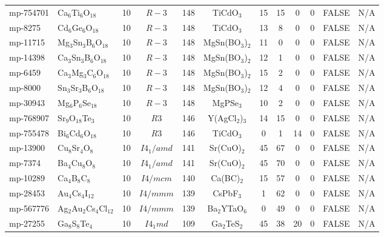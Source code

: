 {\begin{longtable}{llcccccccccc}
    mp-754701 & Ca$_{6}$Ti$_{6}$O$_{18}$ & 10    & $R-3$ & 148   & TiCdO$_{3}$ & 15    & 15    & 0     & 0     & FALSE & N/A \\
    mp-8275 & Cd$_{6}$Ge$_{6}$O$_{18}$ & 10    & $R-3$ & 148   & TiCdO$_{3}$ & 13    & 8     & 0     & 0     & FALSE & N/A \\
    mp-11715 & Mg$_{3}$Sn$_{3}$B$_{6}$O$_{18}$ & 10    & $R-3$ & 148   & MgSn(BO$_{3}$)$_{2}$ & 11    & 0     & 0     & 0     & FALSE & N/A \\
    mp-14398 & Ca$_{3}$Sn$_{3}$B$_{6}$O$_{18}$ & 10    & $R-3$ & 148   & MgSn(BO$_{3}$)$_{2}$ & 12    & 1     & 0     & 0     & FALSE & N/A \\
    mp-6459 & Ca$_{3}$Mg$_{3}$C$_{6}$O$_{18}$ & 10    & $R-3$ & 148   & MgSn(BO$_{3}$)$_{2}$ & 15    & 2     & 0     & 0     & FALSE & N/A \\
    mp-8000 & Sn$_{3}$Sr$_{3}$B$_{6}$O$_{18}$ & 10    & $R-3$ & 148   & MgSn(BO$_{3}$)$_{2}$ & 12    & 4     & 0     & 0     & FALSE & N/A \\
    mp-30943 & Mg$_{6}$P$_{6}$Se$_{18}$ & 10    & $R-3$ & 148   & MgPSe$_{3}$ & 10    & 2     & 0     & 0     & FALSE & N/A \\
    mp-768907 & Sr$_{9}$O$_{18}$Te$_{3}$ & 10    & $R3$  & 146   & Y(AgCl$_{2}$)$_{3}$ & 14    & 15    & 0     & 0     & FALSE & N/A \\
    mp-755478 & Bi$_{6}$Cd$_{6}$O$_{18}$ & 10    & $R3$  & 146   & TiCdO$_{3}$ & 0     & 1     & 14    & 0     & FALSE & N/A \\
    mp-13900 & Cu$_{8}$Sr$_{4}$O$_{8}$ & 10    & $I4_1/amd$ & 141   & Sr(CuO)$_{2}$ & 45    & 67    & 0     & 0     & FALSE & N/A \\
    mp-7374 & Ba$_{4}$Cu$_{8}$O$_{8}$ & 10    & $I4_1/amd$ & 141   & Sr(CuO)$_{2}$ & 45    & 70    & 0     & 0     & FALSE & N/A \\
    mp-10289 & Ca$_{4}$B$_{8}$C$_{8}$ & 10    & $I4/mcm$ & 140   & Ca(BC)$_{2}$ & 15    & 57    & 0     & 0     & FALSE & N/A \\
    mp-28453 & Au$_{4}$Cs$_{4}$I$_{12}$ & 10    & $I4/mmm$ & 139   & CsPbF$_{3}$ & 1     & 62    & 0     & 0     & FALSE & N/A \\
    mp-567776 & Ag$_{2}$Au$_{2}$Cs$_{4}$Cl$_{12}$ & 10    & $I4/mmm$ & 139   & Ba$_{2}$YTaO$_{6}$ & 0     & 49    & 0     & 0     & FALSE & N/A \\
    mp-27255 & Ga$_{8}$S$_{8}$Te$_{4}$ & 10    & $I4_1md$ & 109   & Ga$_{2}$TeS$_{2}$ & 45    & 38    & 20    & 0     & FALSE & N/A \\

\end{longtable}}
